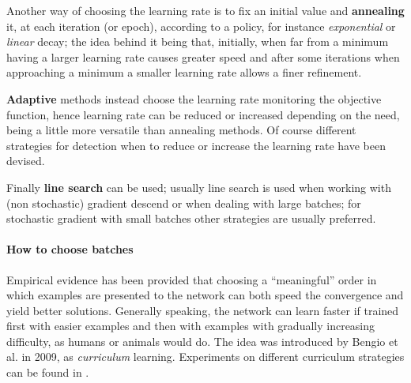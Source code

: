 Another way of choosing the learning rate is to fix an initial value and \textbf{annealing} it, at each iteration (or epoch), according to a policy, for instance \textit{exponential} or \textit{linear} decay; the idea behind it being that, initially, when far from a minimum having a larger learning rate causes greater speed and after some iterations when approaching a minimum a smaller learning rate allows a finer refinement.

\textbf{Adaptive} methods instead choose the learning rate monitoring the objective function, hence learning rate can be reduced
or increased depending on the need, being a little more versatile than annealing methods. Of course different strategies for detection when to reduce or increase the learning rate have been devised.

Finally \textbf{line search} can be used; usually line search is used when working with (non stochastic) gradient 
descend or when dealing with large batches; for stochastic gradient with small batches other strategies are usually 
preferred.

\paragraph{How to choose batches}

Empirical evidence has been provided that choosing a ``meaningful'' order in which examples are presented to the network can both speed the convergence and yield better solutions. Generally speaking, the network can learn faster if trained first with easier examples and then with examples with gradually increasing difficulty, as humans or animals would do. The idea was introduced by Bengio et al.\cite{curriculumLearning} in 2009, as \textit{curriculum} learning. Experiments on different curriculum strategies can be found in \cite{learningToExecute}.

